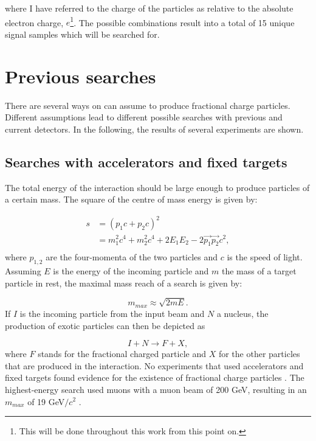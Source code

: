 \noindent where I have referred to the charge of the particles as relative to the absolute electron charge, $e$\footnote{This will be done throughout this work from this point on.}. The possible combinations result into a total of 15 unique signal samples which will be searched for.

\section{Previous searches}
\label{sec:prevsearches}
There are several ways on can assume to produce fractional charge particles. Different assumptions lead to different possible searches with previous and current detectors. In the following, the results of several experiments are shown. 

\subsection{Searches with accelerators and fixed targets}
The total energy of the interaction should be large enough to produce particles of a certain mass. The square of the centre of mass energy is given by:

\begin{equation}
\label{eq:totalenergy}
\begin{split}
s &= \left(p_1c + p_2c\right)^2\\
&= m_1^2c^4 + m_2^2c^4 + 2E_1E_2 - 2\vec{p_1}\vec{p_2}c^2,\\
\end{split}
\end{equation}
where $p_{1,2}$ are the four-momenta of the two particles and $c$ is the speed of light.
Assuming $E$ is the energy of the incoming particle and $m$ the mass of a target particle in rest, the maximal mass reach of a search is given by:

\begin{equation}
m_{max} \approx \sqrt{2 m E}.
\end{equation}
If $I$ is the incoming particle from the input beam and $N$ a nucleus, the production of exotic particles can then be depicted as

\begin{equation}
I + N \rightarrow F + X,
\end{equation}
where $F$ stands for the fractional charged particle and $X$ for the other particles that are produced in the interaction. No experiments that used accelerators and fixed targets found evidence for the existence of fractional charge particles \cite{Lyons:1984pw}. The highest-energy search used muons with a muon beam of 200 GeV, resulting in an $m_{max}$ of 19 GeV$/c^2$ \cite{Aubert:1983jy}.
